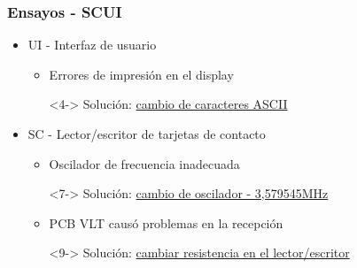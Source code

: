 \documentclass{beamer}
\begin{document}
\begin{frame}
	\frametitle{Ensayos - SCUI}
	\begin{itemize}
		\item <2-> UI - Interfaz de usuario
		\begin{itemize}		
			\item <3-> Errores de impresión en el display
			\item[ ] <4-> Solución: \underline{cambio de caracteres ASCII}
	\end{itemize}

	\bigskip
	\item <5-> SC - Lector/escritor de tarjetas de contacto
		\begin{itemize}
			\item <6-> Oscilador de frecuencia inadecuada
			\item[ ] <7-> Solución: \underline{cambio de oscilador - 3,579545MHz}

			\bigskip
			\item <8-> PCB VLT causó problemas en la recepción
			\item[ ] <9-> Solución: \underline{cambiar resistencia en el lector/escritor}
		\end{itemize}	
	\end{itemize}
\end{frame}
\end{document}
